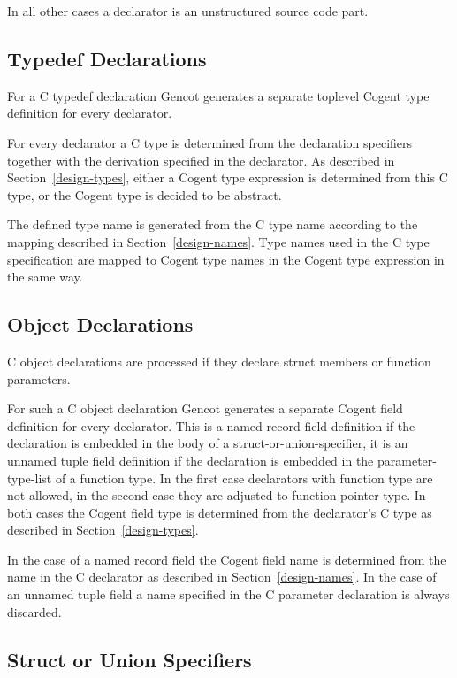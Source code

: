 In all other cases a declarator is an unstructured
source code part.

\subsection{Typedef Declarations}

For a C typedef declaration Gencot generates a separate toplevel Cogent type definition for every declarator.

For every declarator a C type is determined from the declaration specifiers together with the derivation specified
in the declarator. As described in Section~\ref{design-types}, either a Cogent type expression is determined from this C type,
or the Cogent type is decided to be abstract. 

The defined type name is generated from the C type name according to the mapping described in Section~\ref{design-names}.
Type names used in the C type specification are mapped to Cogent type names in the Cogent type expression in the same way.

\subsection{Object Declarations}

C object declarations are processed if they declare struct members or function parameters.

For such a C object declaration Gencot generates a separate Cogent field 
definition for every declarator. This is a named record field definition if the declaration is embedded in the
body of a struct-or-union-specifier, it is an unnamed tuple field definition if the declaration is embedded in the
parameter-type-list of a function type. In the first case declarators with function type are not allowed, in the
second case they are adjusted to function pointer type. In both cases the Cogent field type is determined from the 
declarator's C type as described in Section~\ref{design-types}. 

In the case of a named record field the Cogent
field name is determined from the name in the C declarator as described in Section~\ref{design-names}. In the 
case of an unnamed tuple field a name specified in the C parameter declaration is always discarded.

\subsection{Struct or Union Specifiers}


